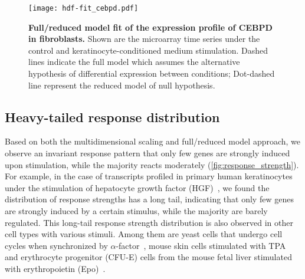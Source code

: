 \begin{figure}[!ht]
\begin{center}
\texttt{[image: hdf-fit\_cebpd.pdf]}
\end{center}
\caption[Full/reduced model fit of gene expression profile]{
{\bf Full/reduced model fit of the expression profile of CEBPD in fibroblasts.}
Shown are the microarray time series under the control and 
keratinocyte-conditioned medium stimulation. Dashed lines indicate the full
model which assumes the alternative hypothesis of differential expression
between conditions; Dot-dashed line represent the reduced model of null 
hypothesis.
}
\label{fig:full_reduced}
\end{figure}

\subsection{Heavy-tailed response distribution}
Based on both the multidimensional scaling and full/reduced
model approach, we observe an invariant response pattern that only few genes are strongly induced upon stimulation, while the majority reacts
moderately (\ref{fig:response_strength}). 
For example, in the case of transcripts
profiled in primary human keratinocytes under the stimulation of 
hepatocyte growth factor (HGF)~\citep{Busch2008}, we found the distribution of response
strengths has a long tail, indicating that 
only few genes are strongly induced by a certain stimulus, while the majority 
are barely regulated. This long-tail response strength
distribution is also observed in other cell types with various stimuli.
Among them are yeast cells that undergo cell cycles when synchronized by 
$\alpha$-factor~\citep{Spellman1998,Cho1998}, mouse skin cells stimulated with TPA~\citep{Riehl2010} and erythrocyte progenitor
(CFU-E) cells from the mouse fetal liver stimulated with erythropoietin (Epo)~\citep{Bachmann2011}. 

